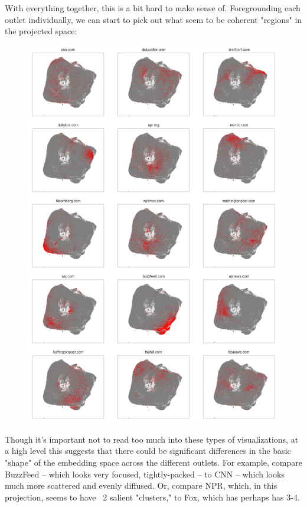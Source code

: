 \documentclass{scrartcl}
\begin{document}
With everything together, this is a bit hard to make sense of. Foregrounding each outlet individually, we can start to pick out what seem to be coherent "regions" in the projected space:

\begin{figure}[H]
  \centering
  \includegraphics[height=0.8\textheight]{figures/umap-multiples.png}
\end{figure}

Though it's important not to read too much into these types of visualizations, at a high level this suggests that there could be significant differences in the basic "shape" of the embedding space across the different outlets. For example, compare BuzzFeed -- which looks very focused, tightly-packed -- to CNN -- which looks much more scattered and evenly diffused. Or, compare NPR, which, in this projection, seems to have ~2 salient "clusters," to Fox, which has perhaps has 3-4.
\end{document}
